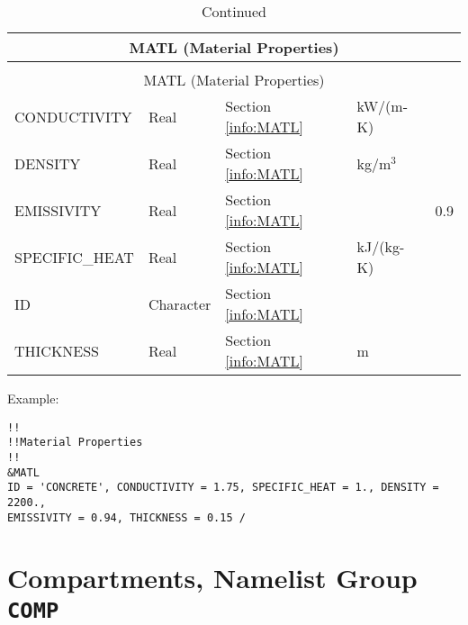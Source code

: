 \begin{longtable}{@{\extracolsep{\fill}}|l|l|l|l|l|}
\caption[Thermal Properties ({\ct MATL} namelist group)]{For more information see Section~\ref{info:MATL}.}
\label{tbl:MATL} \\
\hline
\multicolumn{5}{|c|}{{\ct MATL} (Material Properties)} \\
\hline \hline
\endfirsthead
\caption[]{Continued} \\
\hline
\multicolumn{5}{|c|}{{\ct MATL} (Material Properties)} \\
\hline \hline
\endhead
{\ct CONDUCTIVITY}        & Real 	 & Section \ref{info:MATL}                 & kW/(m-K)  &                 \\ \hline
{\ct DENSITY}             & Real 	 & Section \ref{info:MATL}                 & kg/m$^3$  &                 \\ \hline
{\ct EMISSIVITY}          & Real	 & Section \ref{info:MATL}                 &           &   0.9          \\ \hline
{\ct SPECIFIC\_HEAT}      & Real	 & Section \ref{info:MATL}                 & kJ/(kg-K) &                 \\ \hline
{\ct ID}                  & Character    & Section \ref{info:MATL}                 &           &                 \\ \hline
{\ct THICKNESS}           & Real  	 & Section \ref{info:MATL}                 & m         &                 \\ \hline
\end{longtable}

\noindent Example:
\begin{lstlisting}
!!
!!Material Properties
!!
&MATL
ID = 'CONCRETE', CONDUCTIVITY = 1.75, SPECIFIC_HEAT = 1., DENSITY = 2200.,
EMISSIVITY = 0.94, THICKNESS = 0.15 / 
\end{lstlisting}




\clearpage
\section{Compartments, Namelist Group \texorpdfstring{{\tt COMP}}{COMP}}

